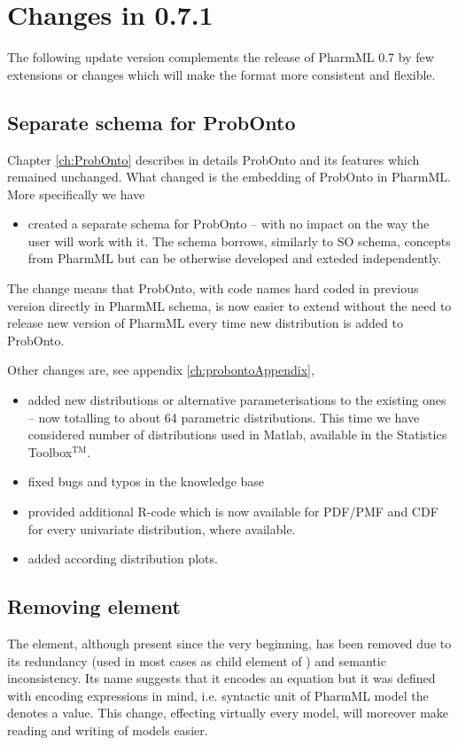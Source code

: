 
\chapter{Changes in 0.7.1}
\label{ch:071changes}
The following update version complements the release of PharmML 0.7 by
few extensions or changes which will make the format more consistent 
and flexible. 

\section{Separate schema for ProbOnto}
Chapter \ref{ch:ProbOnto} describes in details ProbOnto and its features 
which remained unchanged. What changed is the embedding of ProbOnto
in PharmML. More specifically we have 
\begin{itemize}
\item 
created a separate schema for ProbOnto -- with no impact on the way
the user will work with it. The schema borrows, similarly to SO schema, concepts
from PharmML but can be otherwise developed and exteded independently.
\end{itemize}
The change means that ProbOnto, with code names hard coded in previous 
version directly in PharmML schema, is now easier to extend without the need to 
release new version of PharmML every time new distribution is added 
to ProbOnto. 

Other changes are, see appendix \ref{ch:probontoAppendix},
\begin{itemize}
\item 
added new distributions or alternative parameterisations to the existing ones -- now 
totalling to about 64 parametric distributions. This time we have considered number of
distributions used in Matlab, available in the Statistics Toolbox$^{\text{TM}}$.
\item 
fixed bugs and typos in the knowledge base
\item 
provided additional R-code which is now available for PDF/PMF and CDF for every 
univariate distribution, where available.
\item 
added according distribution plots.
\end{itemize}


\section{Removing  element}

The  element, although present since the very beginning, 
has been removed due to its redundancy (used in most cases as child 
element of ) and semantic inconsistency. Its name suggests 
that it encodes an equation but it was defined with encoding expressions in mind, 
i.e. syntactic unit of PharmML model the denotes a value. This change, 
effecting virtually every model, will moreover make reading and writing of 
models easier.

